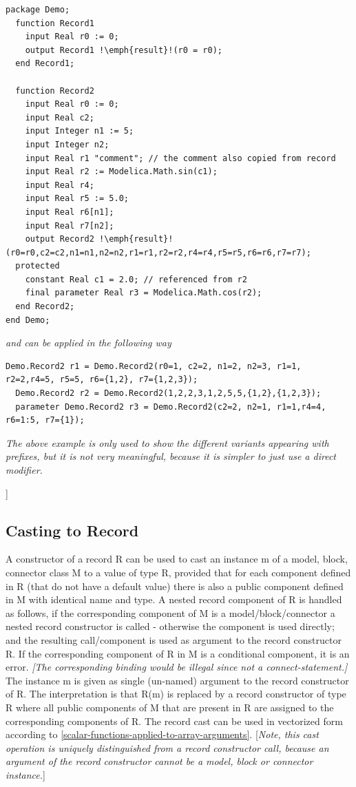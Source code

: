 \documentclass[10pt,a4paper]{report}
\def\doublelabel#1{\label{#1}\hypertarget{#1}{}}
\begin{document}
\begin{lstlisting}[language=modelica,escapechar=!]
package Demo;
  function Record1
    input Real r0 := 0;
    output Record1 !\emph{result}!(r0 = r0);
  end Record1;

  function Record2
    input Real r0 := 0;
    input Real c2;
    input Integer n1 := 5;
    input Integer n2;
    input Real r1 "comment"; // the comment also copied from record
    input Real r2 := Modelica.Math.sin(c1);
    input Real r4;
    input Real r5 := 5.0;
    input Real r6[n1];
    input Real r7[n2];
    output Record2 !\emph{result}!(r0=r0,c2=c2,n1=n1,n2=n2,r1=r1,r2=r2,r4=r4,r5=r5,r6=r6,r7=r7);
  protected
    constant Real c1 = 2.0; // referenced from r2
    final parameter Real r3 = Modelica.Math.cos(r2);
  end Record2;
end Demo;
\end{lstlisting}
\emph{and can be applied in the following way}
\begin{lstlisting}[language=modelica]
  Demo.Record2 r1 = Demo.Record2(r0=1, c2=2, n1=2, n2=3, r1=1, r2=2,r4=5, r5=5, r6={1,2}, r7={1,2,3});
  Demo.Record2 r2 = Demo.Record2(1,2,2,3,1,2,5,5,{1,2},{1,2,3});
  parameter Demo.Record2 r3 = Demo.Record2(c2=2, n2=1, r1=1,r4=4, r6=1:5, r7={1});
\end{lstlisting}

\emph{The above example is only used to show the different variants
appearing with prefixes, but it is not very meaningful, because it is
simpler to just use a direct modifier.}

{]}

\subsection{Casting to Record}\doublelabel{casting-to-record}

A constructor of a record R can be used to cast an instance m of a
model, block, connector class M to a value of type R, provided that for
each component defined in R (that do not have a default value) there is
also a public component defined in M with identical name and type. A
nested record component of R is handled as follows, if the corresponding
component of M is a model/block/connector a nested record constructor is
called - otherwise the component is used directly; and the resulting
call/component is used as argument to the record constructor R. If the
corresponding component of R in M is a conditional component, it is an
error. \emph{{[}The corresponding binding would be illegal since not a
connect-statement.{]}} The instance m is given as single (un-named)
argument to the record constructor of R. The interpretation is that R(m)
is replaced by a record constructor of type R where all public
components of M that are present in R are assigned to the corresponding
components of R. The record cast can be used in vectorized form
according to \ref{scalar-functions-applied-to-array-arguments}. {[}\emph{Note, this cast operation is
uniquely distinguished from a record constructor call, because an
argument of the record constructor cannot be a model, block or connector
instance.}{]}
\end{document}
